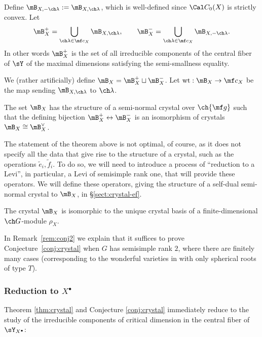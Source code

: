 Define $\mB_{X,-\ch\lambda} := \mB_{X,\ch\lambda}$, which
is well-defined since $\Cal C_0(X)$ is strictly convex.
Let
\[ \mB^+_{X} = \bigcup_{\ch\lambda\in \mf c_X} \mB_{X,\ch\lambda}, \qquad
\mB^-_{X} = \bigcup_{\ch\lambda\in \mf c_X} \mB_{X,-\ch\lambda}. \]
In other words $\mB^+_{X}$ is the set of all irreducible
components of the central fiber of $\sY$ of the maximal dimensions
satisfying the semi-smallness equality.

We (rather artificially) define $\mB_{X} =
\mB_{X}^+ \sqcup \mB_{X}^-$. Let $\mathrm{wt}:\mB_{X} \to \mf c_X$ be the map sending $\mB_{X,\ch\lambda}$ to $\ch\lambda$.


\begin{thm}
\notready \label{thm:crystal}
The set $\mB_{X}$ has the structure of a semi-normal crystal over
$\ch{\mf g}$  such that the defining bijection $\mB_{X}^+ \leftrightarrow \mB_{X}^-$ is an isomorphism of crystals $\mB_{X} \cong \mB_{X}^\vee$.
\end{thm}


The statement of the theorem above is not optimal, of course, as it does not specify all the data that give rise to the structure of a crystal, such as the operations $\tilde e_i,\tilde f_i$. To do so, we will need to introduce a process of ``reduction to a Levi'', in particular, a Levi of semisimple rank one, that will provide these operators. We will define these operators, giving the structure of a self-dual semi-normal crystal to $\mB_X$, in \S\ref{sect:crystal-ef}.

\begin{conj}
\notready \label{conj:crystal}
The crystal $\mB_{X}$ is isomorphic to the unique crystal basis
of a finite-dimensional $\ch G$-module $\rho_X$.
\end{conj}

In Remark~\ref{rem:conj2} we explain that it suffices to prove Conjecture~\ref{conj:crystal}
when $G$ has semisimple rank $2$, where there are finitely many cases (corresponding
to the wonderful varieties in \cite{Wasserman} with only spherical roots of type $T$).


\subsubsection{Reduction to $X^\bullet$}

Theorem \ref{thm:crystal} and Conjecture \ref{conj:crystal} immediately reduce to the study of the irreducible components of critical dimension in the central fiber of $\sY_{X^\bullet}$:


